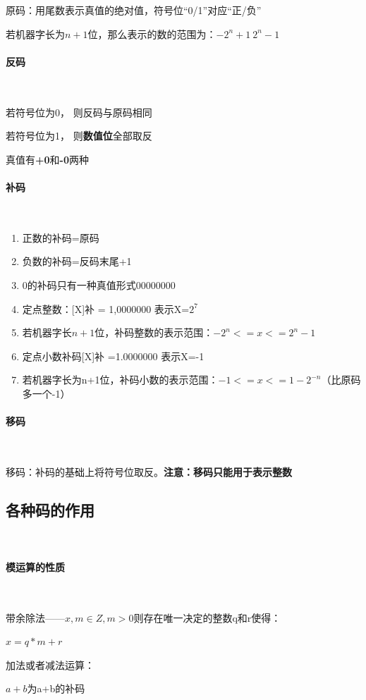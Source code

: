 \documentclass[12pt]{ctexart}
\begin{document}
原码：用尾数表示真值的绝对值，符号位“0/1”对应“正/负”

若机器字长为$n+1$位，那么表示的数的范围为：$-2^{n}+1 ~ 2^{n}-1$
\paragraph{反码}~{}

若符号位为0， 则反码与原码相同

若符号位为1， 则\textbf{数值位}全部取反

真值有\textbf{+0}和\textbf{-0}两种

\paragraph{补码}~{}
\begin{enumerate}
    \item 正数的补码=原码
    \item 负数的补码=反码末尾+1
    \item 0的补码只有一种真值形式00000000
    \item 定点整数：[X]补 = 1,0000000 表示X=$2^7$
    \item 若机器字长$n+1$位，补码整数的表示范围：$-2^n<=x<=2^n-1$
    \item 定点小数补码[X]补 =1.0000000 表示X=-1
    \item 若机器字长为n+1位，补码小数的表示范围：$-1<=x<=1-2^{-n}$（比原码多一个-1）
\end{enumerate}

\paragraph{移码}~{}

移码：补码的基础上将符号位取反。\textbf{注意：移码只能用于表示整数}

\subsection{各种码的作用}~{}

\paragraph{模运算的性质}~{}

带余除法——$x,m \in Z, m > 0$则存在唯一决定的整数q和r使得：

$x = q*m + r$

加法或者减法运算：

$a+b$为a+b的补码
\end{document}
